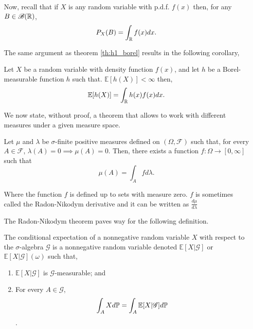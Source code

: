 \documentclass[../TGMAFFIRO.tex]{subfiles}
\begin{document}
Now, recall that if $X$ is any random variable with p.d.f. $f(x)$ then, for any $B \in \mathscr{B}(\mathbb{R})$,
\begin{equation*}
	P_X(B) = \int_{\mathbb{R}}  f(x) dx.
\end{equation*}

The same argument as theorem \ref{th:h1_borel} results in the following corollary,
\begin{corollary}
	Let $X$ be a random variable with density function $f(x)$, and let $h$ be a Borel-measurable function $h$ such that. $\mathbb{E}[h(X)] < \infty$ then,
	\begin{equation}
		\mathbb{E}[h(X)] = \int_{\mathbb{R}} h(x) f(x) dx.
	\end{equation}
\end{corollary}

We now state, without proof, a theorem that allows to work with different measures under a given measure space.

\begin{theorem}\label{th:radon-nikodym}
Let $\mu$ and $\lambda$ be $\sigma$-finite positive measures defined on $(\Omega, \mathscr{F})$ such that, for every $A \in \mathscr{F}$, $\lambda(A) = 0 \implies \mu(A)= 0$. Then, there exists a function $f: \Omega \to [0, \infty]$ such that
\[
	\mu(A) = \int_A f d\lambda.
\]

Where the function $f$ is defined up to sets with measure zero. $f$ is sometimes called the Radon-Nikodym derivative and it can be written as $\frac{d\mu}{d\lambda}$
\end{theorem}

The Radon-Nikodym theorem paves way for the following definition.

\begin{definition}
The conditional expectation of a nonnegative random variable $X$ with respect to the $\sigma$-algebra $\mathscr{G}$ is a nonnegative random variable denoted $\mathbb{E}[X | \mathscr{G}]$ or $\mathbb{E}[X | \mathscr{G}](\omega)$ such that,
\begin{enumerate}
	\item $\mathbb{E}[X | \mathscr{G}]$ is $\mathscr{G}$-measurable; and
	\item For every $A \in \mathscr{G}$,
	\[\int_A X d\mathbb{P} = \int_A \mathbb{E}[X | \mathscr{G}] d\mathbb{P}\].
\end{enumerate}

\end{definition}
\end{document}
